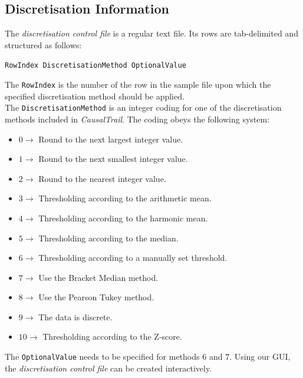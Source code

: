 \subsection{Discretisation Information}
\label{subsection:discInf}
The \textit{discretisation control file} is a regular text file.
Its rows are tab-delimited and structured as follows:
\begin{center}
\texttt{RowIndex	DiscretisationMethod	OptionalValue}
\end{center}
The \texttt{RowIndex} is the number of the row in the sample file upon which the specified discretisation method should 
be applied.
\\The \texttt{DiscretisationMethod} is an integer coding for one of the discretisation methods included in \textit{CausalTrail}.
The coding obeys the following system:
\begin{itemize}
	\item $0 \rightarrow$ Round to the next largest integer value.
	\item $1 \rightarrow$ Round to the next smallest integer value.
	\item $2 \rightarrow$ Round to the nearest integer value.
	\item $3 \rightarrow$ Thresholding according to the arithmetic mean.
	\item $4 \rightarrow$ Thresholding according to the harmonic mean.
	\item $5 \rightarrow$ Thresholding according to the  median.
	\item $6 \rightarrow$ Thresholding according to a manually set threshold.
	\item $7 \rightarrow$ Use the Bracket Median method.
	\item $8 \rightarrow$ Use the Pearson Tukey method.
	\item $9 \rightarrow$ The data is discrete.
	\item $10 \rightarrow$ Thresholding according to the Z-score.
\end{itemize}
The \texttt{OptionalValue} needs to be specified for methods $6$ and $7$.
Using our GUI, the \textit{discretisation control file} can be created interactively.                                                             

\mbox{}
\newpage

